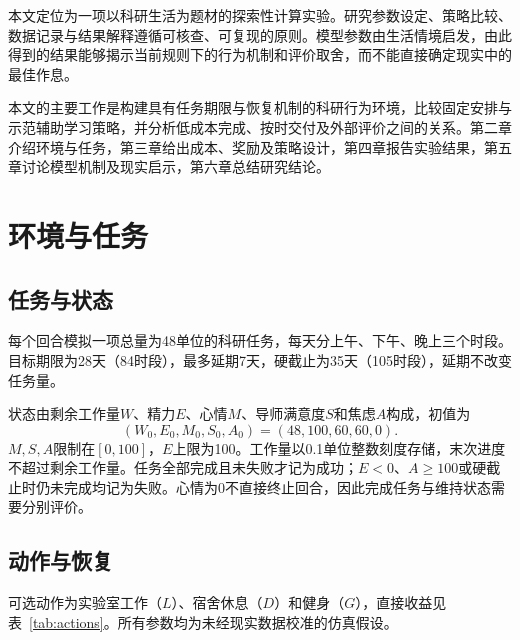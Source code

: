 \documentclass[journal]{IEEEtran}
\begin{document}
本文定位为一项以科研生活为题材的探索性计算实验。研究参数设定、策略比较、数据记录与结果解释遵循可核查、可复现的原则。模型参数由生活情境启发，由此得到的结果能够揭示当前规则下的行为机制和评价取舍，而不能直接确定现实中的最佳作息。

本文的主要工作是构建具有任务期限与恢复机制的科研行为环境，比较固定安排与示范辅助学习策略，并分析低成本完成、按时交付及外部评价之间的关系。第二章介绍环境与任务，第三章给出成本、奖励及策略设计，第四章报告实验结果，第五章讨论模型机制及现实启示，第六章总结研究结论。
\section{环境与任务}

\subsection{任务与状态}

每个回合模拟一项总量为48单位的科研任务，每天分上午、下午、晚上三个时段。目标期限为28天（84时段），最多延期7天，硬截止为35天（105时段），延期不改变任务量。

状态由剩余工作量$W$、精力$E$、心情$M$、导师满意度$S$和焦虑$A$构成，初值为
\begin{equation}
(W_0,E_0,M_0,S_0,A_0)=(48,100,60,60,0).
\end{equation}
$M,S,A$限制在$[0,100]$，$E$上限为100。工作量以0.1单位整数刻度存储，末次进度不超过剩余工作量。任务全部完成且未失败才记为成功；$E<0$、$A\ge100$或硬截止时仍未完成均记为失败。心情为0不直接终止回合，因此完成任务与维持状态需要分别评价。

\subsection{动作与恢复}

可选动作为实验室工作（$L$）、宿舍休息（$D$）和健身（$G$），直接收益见表~\ref{tab:actions}。所有参数均为未经现实数据校准的仿真假设。

\begin{table}[ht]
\begin{center}
\small
{}
\end{center}
\caption{各动作的直接收益。斜线依次表示上午、下午、晚上；未分时段的数值在三个时段相同。}
\label{tab:actions}
\end{table}
\end{document}
